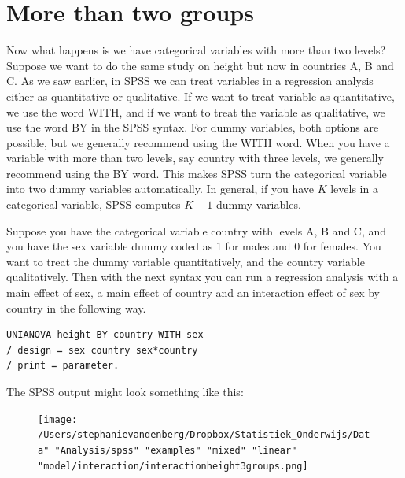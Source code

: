 \documentclass[]{report}\usepackage[]{graphicx}\usepackage[]{color}
\begin{document}
\section{More than two groups}

Now what happens is we have categorical variables with more than two levels? Suppose we want to do the same study on height but now in countries A, B and C. As we saw earlier, in SPSS we can treat variables in a regression analysis either as quantitative or qualitative. If we want to treat variable as quantitative, we use the word WITH, and if we want to treat the variable as qualitative, we use the word BY in the SPSS syntax. For dummy variables, both options are possible, but we generally recommend using the WITH word. When you have a variable with more than two levels, say country with three levels, we generally recommend using the BY word. This makes SPSS turn the categorical variable into two dummy variables automatically. In general, if you have $K$ levels in a categorical variable, SPSS computes $K-1$ dummy variables.

Suppose you have the categorical variable country with levels A, B and C, and you have the sex variable dummy coded as 1 for males and 0 for females. You want to treat the dummy variable quantitatively, and the country variable qualitatively. Then with the next syntax you can run a regression analysis with a main effect of sex, a main effect of country and an interaction effect of sex by country in the following way.
\begin{verbatim}
UNIANOVA height BY country WITH sex 
/ design = sex country sex*country
/ print = parameter.
\end{verbatim}


The SPSS output might look something like this:


\begin{figure}[h]
    \begin{center}
       \texttt{[image: /Users/stephanievandenberg/Dropbox/Statistiek\_Onderwijs/Data" "Analysis/spss" "examples" "mixed" "linear" "model/interaction/interactionheight3groups.png]}
    \end{center}
\end{figure}
\end{document}
